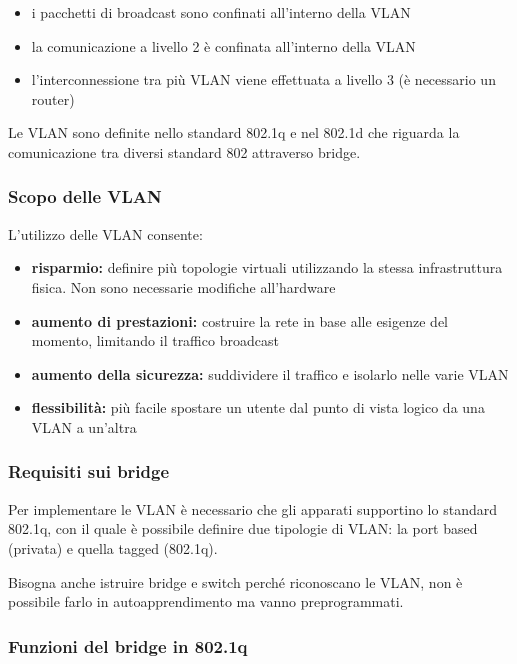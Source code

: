 \documentclass{report}
\begin{document}
\begin{itemize}
\item
  i pacchetti di broadcast sono confinati all'interno della VLAN
\item
  la comunicazione a livello 2 è confinata all'interno della VLAN
\item
  l'interconnessione tra più VLAN viene effettuata a livello 3 (è
  necessario un router)
\end{itemize}

Le VLAN sono definite nello standard 802.1q e nel 802.1d che riguarda la
comunicazione tra diversi standard 802 attraverso bridge.

\hypertarget{header-n306}{%
\subsubsection{Scopo delle VLAN}\label{header-n306}}

L'utilizzo delle VLAN consente:

\begin{itemize}
\item
  \textbf{risparmio: }definire più topologie virtuali utilizzando la
  stessa infrastruttura fisica. Non sono necessarie modifiche
  all'hardware
\item
  \textbf{aumento di prestazioni: }costruire la rete in base alle
  esigenze del momento, limitando il traffico broadcast
\item
  \textbf{aumento della sicurezza: }suddividere il traffico e isolarlo
  nelle varie VLAN
\item
  \textbf{flessibilità: }più facile spostare un utente dal punto di
  vista logico da una VLAN a un'altra
\end{itemize}

\hypertarget{header-n317}{%
\subsubsection{Requisiti sui bridge}\label{header-n317}}

Per implementare le VLAN è necessario che gli apparati supportino lo
standard 802.1q, con il quale è possibile definire due tipologie di
VLAN: la port based (privata) e quella tagged (802.1q).

Bisogna anche istruire bridge e switch perché riconoscano le VLAN, non è
possibile farlo in autoapprendimento ma vanno preprogrammati.

\hypertarget{header-n320}{%
\subsubsection{Funzioni del bridge in 802.1q}\label{header-n320}}
\end{document}
